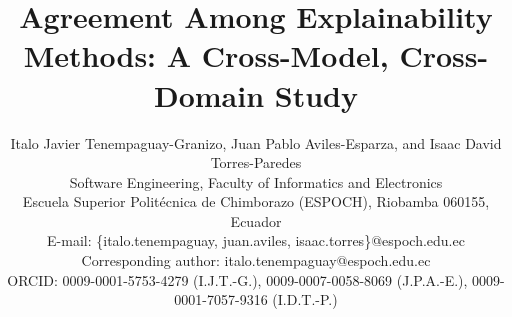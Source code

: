 \documentclass[11pt,twoside,a4paper]{article}
\begin{document}
\title{Agreement Among Explainability Methods: A Cross-Model, Cross-Domain Study}
\author{Italo Javier Tenempaguay-Granizo, Juan Pablo Aviles-Esparza, and Isaac David Torres-Paredes \\
   Software Engineering, Faculty of Informatics and Electronics \\
   Escuela Superior Politécnica de Chimborazo (ESPOCH), Riobamba 060155, Ecuador \\
   E-mail: \{italo.tenempaguay, juan.aviles, isaac.torres\}@espoch.edu.ec \\
   Corresponding author: italo.tenempaguay@espoch.edu.ec \\
   ORCID: 0009-0001-5753-4279 (I.J.T.-G.), 0009-0007-0058-8069 (J.P.A.-E.), 0009-0001-7057-9316 (I.D.T.-P.)}
\end{document}

